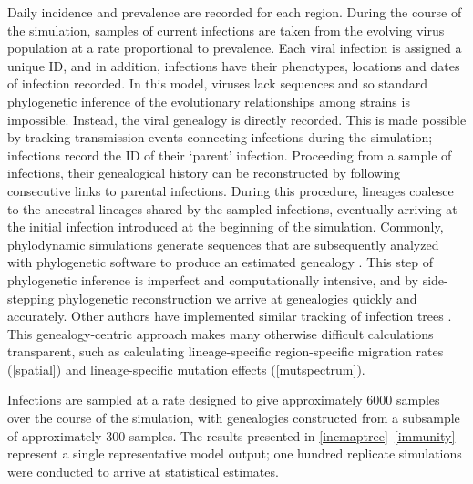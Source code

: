 Daily incidence and prevalence are recorded for each region.  During the course of the simulation, samples of current infections are taken from the evolving virus population at a rate proportional to prevalence.  Each viral infection is assigned a unique ID, and in addition, infections have their phenotypes, locations and dates of infection recorded.  In this model, viruses lack sequences and so standard phylogenetic inference of the evolutionary relationships among strains is impossible.  Instead, the viral genealogy is directly recorded.  This is made possible by tracking transmission events connecting infections during the simulation; infections record the ID of their `parent' infection.  Proceeding from a sample of infections, their genealogical history can be reconstructed by following consecutive links to parental infections.  During this procedure, lineages coalesce to the ancestral lineages shared by the sampled infections, eventually arriving at the initial infection introduced at the beginning of the simulation.  Commonly, phylodynamic simulations generate sequences that are subsequently analyzed with phylogenetic software to produce an estimated genealogy \cite{Ferguson03,Koelle06} .  This step of phylogenetic inference is imperfect and computationally intensive, and by side-stepping phylogenetic reconstruction we arrive at genealogies quickly and accurately.  Other authors have implemented similar tracking of infection trees .  This genealogy-centric approach makes many otherwise difficult calculations transparent, such as calculating lineage-specific region-specific migration rates (\ref{spatial}) and lineage-specific mutation effects (\ref{mutspectrum}).

Infections are sampled at a rate designed to give approximately 6000 samples over the course of the simulation, with genealogies constructed from a subsample of approximately 300 samples.  The results presented in \ref{incmaptree}--\ref{immunity} represent a single representative model output; one hundred replicate simulations were conducted to arrive at statistical estimates. 



